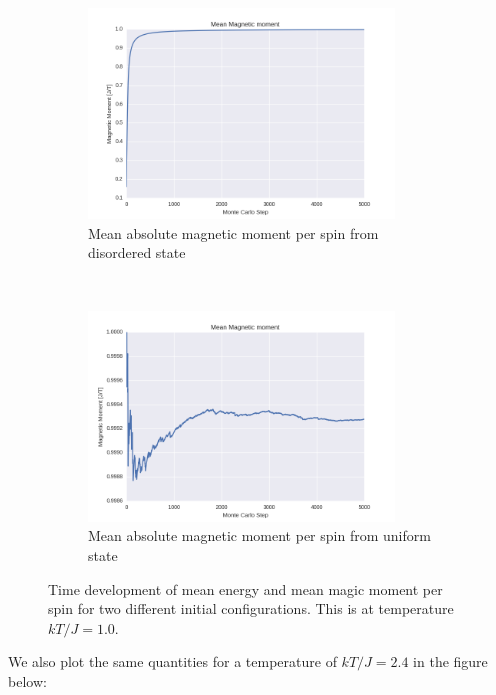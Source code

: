 \documentclass[a4paper, 10pt]{article}
\begin{document}
\begin{figure}[!ht]
\begin{subfigure}[H!]{0.5\textwidth}
        \centering
        \includegraphics[height=2.2in]{meanMagMomWRandomStart.png}
        \caption{Mean absolute magnetic moment per spin from disordered state}
    \end{subfigure}%
    ~ 
    \begin{subfigure}[H!]{0.5\textwidth}
        \centering
        \includegraphics[height=2.2in]{meanMagMomWUpStart.png}
        \caption{Mean absolute magnetic moment per spin from uniform state}
    \end{subfigure}
      \caption{Time development of mean energy and mean magic moment per spin for two different initial configurations. This is at temperature $kT/J=1.0$.}\label{fig:20x20_Sweep_T_1}
\end{figure}
We also plot the same quantities for a temperature of $kT/J=2.4$ in the figure below:
\end{document}
